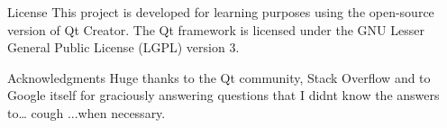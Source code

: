 License This project is developed for learning purposes using the open-\/source version of Qt Creator. The Qt framework is licensed under the GNU Lesser General Public License (LGPL) version 3.

Acknowledgments Huge thanks to the Qt community, Stack Overflow and to Google itself for graciously answering questions that I didn\textquotesingle{}t know the answers to… cough ...when necessary. 